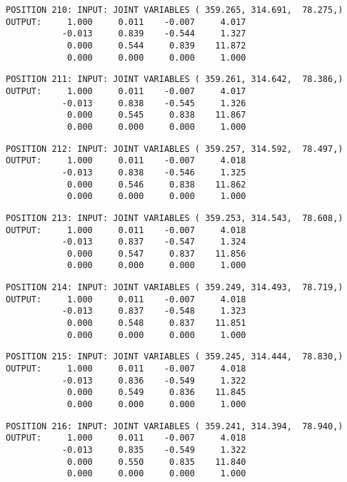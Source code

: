 \begin{verbatim}
POSITION 210: INPUT: JOINT VARIABLES ( 359.265, 314.691,  78.275,)
OUTPUT:     1.000     0.011    -0.007     4.017
           -0.013     0.839    -0.544     1.327
            0.000     0.544     0.839    11.872
            0.000     0.000     0.000     1.000
\end{verbatim} \pagebreak[1]\begin{verbatim}
POSITION 211: INPUT: JOINT VARIABLES ( 359.261, 314.642,  78.386,)
OUTPUT:     1.000     0.011    -0.007     4.017
           -0.013     0.838    -0.545     1.326
            0.000     0.545     0.838    11.867
            0.000     0.000     0.000     1.000
\end{verbatim} \pagebreak[1]\begin{verbatim}
POSITION 212: INPUT: JOINT VARIABLES ( 359.257, 314.592,  78.497,)
OUTPUT:     1.000     0.011    -0.007     4.018
           -0.013     0.838    -0.546     1.325
            0.000     0.546     0.838    11.862
            0.000     0.000     0.000     1.000
\end{verbatim} \pagebreak[1]\begin{verbatim}
POSITION 213: INPUT: JOINT VARIABLES ( 359.253, 314.543,  78.608,)
OUTPUT:     1.000     0.011    -0.007     4.018
           -0.013     0.837    -0.547     1.324
            0.000     0.547     0.837    11.856
            0.000     0.000     0.000     1.000
\end{verbatim} \pagebreak[1]\begin{verbatim}
POSITION 214: INPUT: JOINT VARIABLES ( 359.249, 314.493,  78.719,)
OUTPUT:     1.000     0.011    -0.007     4.018
           -0.013     0.837    -0.548     1.323
            0.000     0.548     0.837    11.851
            0.000     0.000     0.000     1.000
\end{verbatim} \pagebreak[1]\begin{verbatim}
POSITION 215: INPUT: JOINT VARIABLES ( 359.245, 314.444,  78.830,)
OUTPUT:     1.000     0.011    -0.007     4.018
           -0.013     0.836    -0.549     1.322
            0.000     0.549     0.836    11.845
            0.000     0.000     0.000     1.000
\end{verbatim} \pagebreak[1]\begin{verbatim}
POSITION 216: INPUT: JOINT VARIABLES ( 359.241, 314.394,  78.940,)
OUTPUT:     1.000     0.011    -0.007     4.018
           -0.013     0.835    -0.549     1.322
            0.000     0.550     0.835    11.840
            0.000     0.000     0.000     1.000
\end{verbatim} \pagebreak[1]\begin{verbatim}

\end{verbatim}
